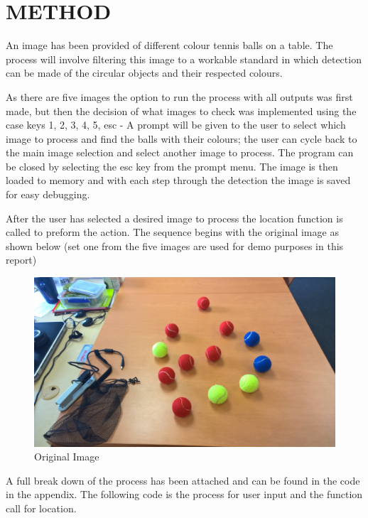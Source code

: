 \documentclass[a4paper, 10pt]{article}
\begin{document}

\section{METHOD}

An image has been provided of different colour tennis balls on a table. The process will involve filtering this image to a workable standard in which detection can be made of the circular objects and their respected colours. 

As there are five images the option to run the process with all outputs was first made, but then the decision of what images to check was implemented using the case keys 1, 2, 3, 4, 5, esc - A prompt will be given to the user to select which image to process and find the balls with their colours; the user can cycle back to the main image selection and select another image to process. The program can be closed by selecting the esc key from the prompt menu. The image is then loaded to memory and with each step through the detection the image is saved for easy debugging.  

After the user has selected a desired image to process the location function is called to preform the action. The sequence begins with the original image as shown below (set one from the five images are used for demo purposes in this report)

\begin{figure}[H]
  \includegraphics[width=\linewidth]{images/1}
  \caption{Original Image}
  \label{fig:Original Image}
\end{figure}

\clearpage
A full break down of the process has been attached and can be found in the code in the appendix. The following code is the process for user input and the function call for location.
\end{document}
